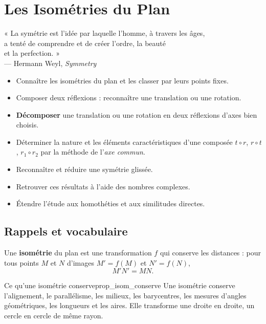 \chapter{Les Isométries du Plan}

\begin{citationchapitre}
	« La symétrie est l'idée par laquelle l'homme, à travers les âges,\\
	a tenté de comprendre et de créer l'ordre, la beauté\\
	et la perfection. »\\[0.4em]
	— Hermann Weyl, \emph{Symmetry}
\end{citationchapitre}

\begin{objectifs}
	\begin{itemize}[label=\textbullet]
		\item Connaître les isométries du plan et les classer par leurs points fixes.
		\item Composer deux réflexions : reconnaître une translation ou une rotation.
		\item \textbf{Décomposer} une translation ou une rotation en deux réflexions
		d'axes bien choisis.
		\item Déterminer la nature et les éléments caractéristiques d'une composée
		$t\circ r$, $r\circ t$, $r_1\circ r_2$ par la méthode de l'\emph{axe commun}.
		\item Reconnaître et réduire une symétrie glissée.
		\item Retrouver ces résultats à l'aide des nombres complexes.
		\item Étendre l'étude aux homothéties et aux similitudes directes.
	\end{itemize}
\end{objectifs}


\section{Rappels et vocabulaire}

\begin{definition}
	Une \textbf{isométrie} du plan est une transformation $f$ qui conserve les
	distances : pour tous points $M$ et $N$ d'images $M'=f(M)$ et $N'=f(N)$,
	$$
	M'N' = MN.
	$$
\end{definition}

\begin{propriete}{Ce qu'une isométrie conserve}{prop_isom_conserve}
	Une isométrie conserve l'alignement, le parallélisme, les milieux, les
	barycentres, les mesures d'angles géométriques, les longueurs et les aires.
	Elle transforme une droite en droite, un cercle en cercle de même rayon.
\end{propriete}

